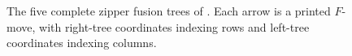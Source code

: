 \begin{figure}[ht]
    \centering
    \caption{The five complete zipper fusion trees of
        \cite[Section~3.4, equation~(33)]{Bultinck2017Anyons}. Each arrow is
        a printed $F$-move, with right-tree coordinates indexing rows and
        left-tree coordinates indexing columns.}
    \label{fig:mpdo_complete_zipper_fusion_pentagon}
\end{figure}

